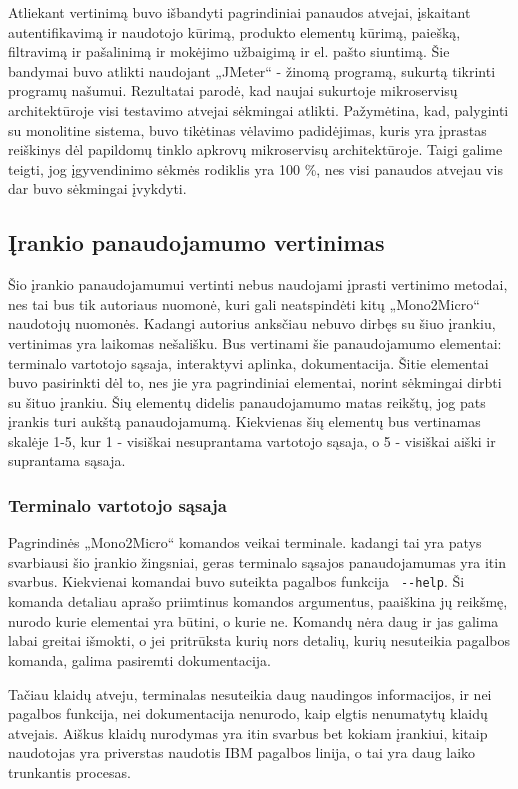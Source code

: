 \documentclass{VUMIFPSbakalaurinis}
\begin{document}
Atliekant vertinimą buvo išbandyti pagrindiniai panaudos atvejai, įskaitant autentifikavimą ir naudotojo kūrimą, produkto elementų kūrimą, paiešką, filtravimą ir pašalinimą ir mokėjimo užbaigimą ir el. pašto siuntimą. Šie bandymai buvo atlikti naudojant „JMeter“ - žinomą programą, sukurtą tikrinti programų našumui. Rezultatai parodė, kad naujai sukurtoje mikroservisų architektūroje visi testavimo atvejai sėkmingai atlikti. Pažymėtina, kad, palyginti su monolitine sistema, buvo tikėtinas vėlavimo padidėjimas, kuris yra įprastas reiškinys dėl papildomų tinklo apkrovų mikroservisų architektūroje. Taigi galime teigti, jog įgyvendinimo sėkmės rodiklis yra 100 \%, nes visi panaudos atvejau vis dar buvo sėkmingai įvykdyti.


\subsection{Įrankio panaudojamumo vertinimas}
Šio įrankio panaudojamumui vertinti nebus naudojami įprasti vertinimo metodai, nes tai bus tik autoriaus nuomonė, kuri gali neatspindėti kitų „Mono2Micro“ naudotojų nuomonės. Kadangi autorius anksčiau nebuvo dirbęs su šiuo įrankiu, vertinimas yra laikomas nešališku. Bus vertinami šie panaudojamumo elementai: terminalo vartotojo sąsaja, interaktyvi aplinka, dokumentacija. Šitie elementai buvo pasirinkti dėl to, nes jie yra pagrindiniai elementai, norint sėkmingai dirbti su šituo įrankiu. Šių elementų didelis panaudojamumo matas reikštų, jog pats įrankis turi aukštą panaudojamumą. Kiekvienas šių elementų bus vertinamas skalėje 1-5, kur 1 - visiškai nesuprantama vartotojo sąsaja, o 5 - visiškai aiški ir suprantama sąsaja.

\subsubsection{Terminalo vartotojo sąsaja}
Pagrindinės „Mono2Micro“ komandos veikai terminale. kadangi tai yra patys svarbiausi šio įrankio žingsniai, geras terminalo sąsajos panaudojamumas yra itin svarbus. Kiekvienai komandai buvo suteikta pagalbos funkcija \verb| --help|. Ši komanda detaliau aprašo priimtinus komandos argumentus, paaiškina jų reikšmę, nurodo kurie elementai yra būtini, o kurie ne. Komandų nėra daug ir jas galima labai greitai išmokti, o jei pritrūksta kurių nors detalių, kurių nesuteikia pagalbos komanda, galima pasiremti dokumentacija.

Tačiau klaidų atveju, terminalas nesuteikia daug naudingos informacijos, ir nei pagalbos funkcija, nei dokumentacija nenurodo, kaip elgtis nenumatytų klaidų atvejais. Aiškus klaidų nurodymas yra itin svarbus bet kokiam įrankiui, kitaip naudotojas yra priverstas naudotis IBM pagalbos linija, o tai yra daug laiko trunkantis procesas.
\end{document}
